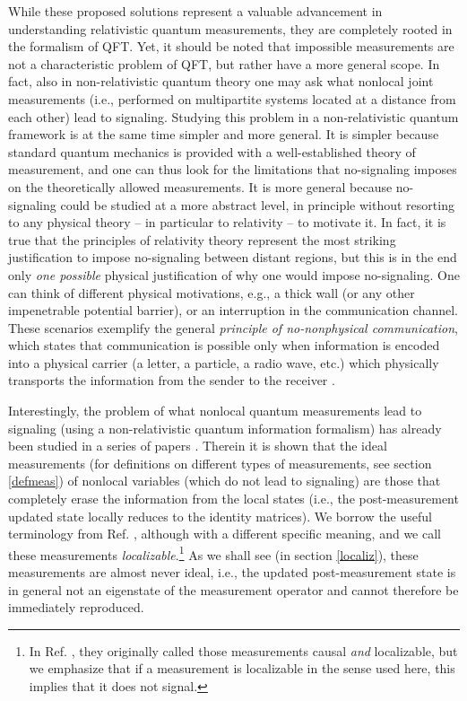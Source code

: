 \documentclass[a4paper,twocolumn,11pt,accepted=2024-02-14]{quantumarticle}
\begin{document}
While these proposed solutions represent a valuable advancement in  understanding  relativistic quantum measurements, they are completely rooted in the formalism of QFT. Yet, it should be noted that impossible measurements are not a characteristic problem of QFT, but rather have a more general scope. In fact, also in non-relativistic quantum theory one may ask what nonlocal joint measurements (i.e., performed on multipartite systems located at a distance from each other) lead to signaling. Studying this problem in a non-relativistic quantum framework is at the same time  simpler and  more general. It is simpler because standard quantum mechanics is provided with a well-established theory of measurement, and one can thus look for the limitations that no-signaling imposes on the theoretically allowed measurements. It is more general because no-signaling could be studied at a more abstract level, in principle without resorting to any physical theory -- in particular to relativity -- to motivate it. In fact, it is true that the principles of  relativity theory represent the most striking justification to impose no-signaling between distant regions, but this is in the end only \textit{one possible} physical justification of why one would impose no-signaling. One can think of different physical motivations, e.g., a thick wall (or any other impenetrable potential barrier), or an interruption in the communication channel. These scenarios exemplify the general \textit{principle of no-nonphysical communication}, which states that communication is possible only when information is encoded into a physical carrier (a letter, a particle, a radio wave, etc.) which physically transports the information from the sender to the receiver \cite{gisin2014quantum}.

Interestingly, the problem of what nonlocal quantum measurements lead to signaling (using a non-relativistic quantum information formalism) has    already been studied in a series of papers \cite{aharonov1986measurement, popescu1994causality, groisman2001nonlocal, groisman2002measurements, vaidman2003instantaneous, groisman2003instantaneous, clark2010entanglement,  beigi2011simplified, gonzales2019bounds}. Therein  it is shown that the ideal measurements (for definitions on different types of measurements, see section \ref{defmeas}) of nonlocal variables (which do not lead to signaling) are those that completely erase the information from the local states (i.e., the post-measurement updated state locally reduces to the identity matrices). We borrow the useful terminology from Ref. \cite{beckman2001causal}, although with a different specific meaning, and we call these measurements \textit{localizable}.\footnote{In Ref. \cite{beckman2001causal}, they originally called those measurements causal \textit{and} localizable, but we emphasize that if a measurement is localizable in the sense used here, this implies that it does not signal.} As we shall see (in section \ref{localiz}), these measurements are almost never ideal, i.e., the updated post-measurement state is in general not an eigenstate of the measurement operator and cannot therefore be immediately reproduced. 
\end{document}
